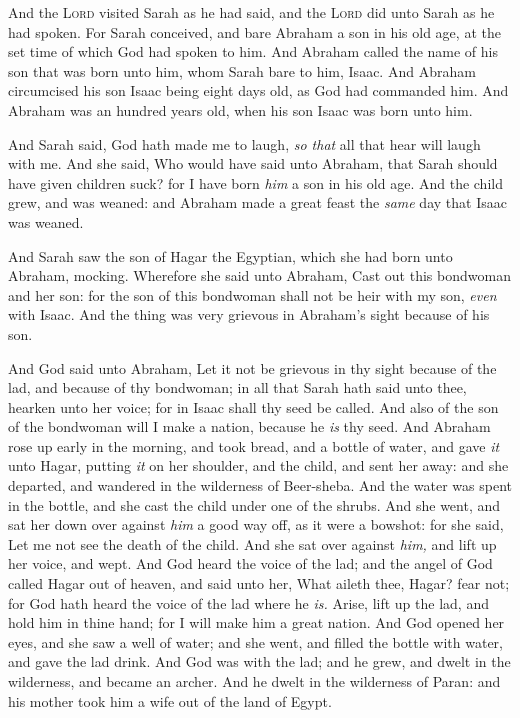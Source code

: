 \documentclass[11pt,letterpaper,oneside]{memoir}
\begin{document}
And the \textsc{Lord} visited Sarah as he had said, and the \textsc{Lord}
did unto Sarah as he had spoken. For Sarah conceived, and bare Abraham a
son in his old age, at the set time of which God had spoken to him. And
Abraham called the name of his son that was born unto him, whom Sarah
bare to him, Isaac. And Abraham circumcised his son Isaac being eight
days old, as God had commanded him. And Abraham was an hundred years
old, when his son Isaac was born unto him.

And Sarah said, God hath made me to laugh, \emph{so that} all that hear
will laugh with me. And she said, Who would have said unto Abraham, that
Sarah should have given children suck? for I have born \emph{him} a son
in his old age. And the child grew, and was weaned: and Abraham made a
great feast the \emph{same} day that Isaac was weaned.

And Sarah saw the son of Hagar the Egyptian, which she had born unto
Abraham, mocking. Wherefore she said unto Abraham, Cast out this
bondwoman and her son: for the son of this bondwoman shall not be heir
with my son, \emph{even} with Isaac. And the thing was very grievous in
Abraham's sight because of his son.

And God said unto Abraham, Let it not be grievous in thy sight because
of the lad, and because of thy bondwoman; in all that Sarah hath said
unto thee, hearken unto her voice; for in Isaac shall thy seed be
called. And also of the son of the bondwoman will I make a nation,
because he \emph{is} thy seed. And Abraham rose up early in the morning,
and took bread, and a bottle of water, and gave \emph{it} unto Hagar,
putting \emph{it} on her shoulder, and the child, and sent her away: and
she departed, and wandered in the wilderness of Beer-sheba. And the
water was spent in the bottle, and she cast the child under one of the
shrubs. And she went, and sat her down over against \emph{him} a good
way off, as it were a bowshot: for she said, Let me not see the death of
the child. And she sat over against \emph{him,} and lift up her voice,
and wept. And God heard the voice of the lad; and the angel of God
called Hagar out of heaven, and said unto her, What aileth thee, Hagar?
fear not; for God hath heard the voice of the lad where he \emph{is.
}Arise, lift up the lad, and hold him in thine hand; for I will make him
a great nation. And God opened her eyes, and she saw a well of water;
and she went, and filled the bottle with water, and gave the lad drink.
And God was with the lad; and he grew, and dwelt in the wilderness, and
became an archer. And he dwelt in the wilderness of Paran: and his
mother took him a wife out of the land of Egypt.
\end{document}
